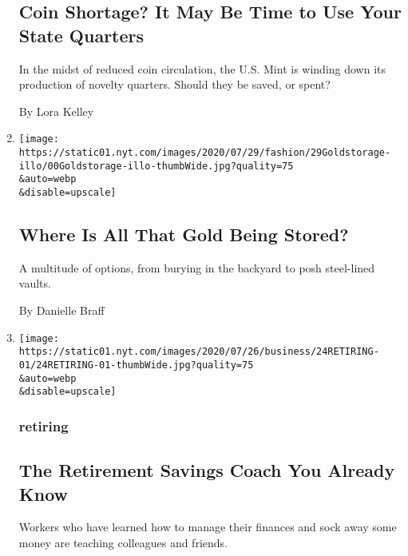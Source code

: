\begin{enumerate}
  \hypertarget{coin-shortage-it-may-be-time-to-use-your-state-quarters}{%
  \subsection{Coin Shortage? It May Be Time to Use Your State
  Quarters}\label{coin-shortage-it-may-be-time-to-use-your-state-quarters}}

  In the midst of reduced coin circulation, the U.S. Mint is winding
  down its production of novelty quarters. Should they be saved, or
  spent?

  By Lora Kelley
\item
  \href{/2020/07/28/style/gold-storage.html}{}

  \texttt{[image: https://static01.nyt.com/images/2020/07/29/fashion/29Goldstorage-illo/00Goldstorage-illo-thumbWide.jpg?quality=75\\\&auto=webp\\\&disable=upscale]}

  \hypertarget{where-is-all-that-gold-being-stored}{%
  \subsection{Where Is All That Gold Being
  Stored?}\label{where-is-all-that-gold-being-stored}}

  A multitude of options, from burying in the backyard to posh
  steel-lined vaults.

  By Danielle Braff
\item
  \href{/2020/07/25/business/retirement-savings-mentor.html}{}

  \texttt{[image: https://static01.nyt.com/images/2020/07/26/business/24RETIRING-01/24RETIRING-01-thumbWide.jpg?quality=75\\\&auto=webp\\\&disable=upscale]}

  \hypertarget{retiring}{%
  \subsubsection{retiring}\label{retiring}}

  \hypertarget{the-retirement-savings-coach-you-already-know}{%
  \subsection{The Retirement Savings Coach You Already
  Know}\label{the-retirement-savings-coach-you-already-know}}

  Workers who have learned how to manage their finances and sock away
  some money are teaching colleagues and friends.


\end{enumerate}
